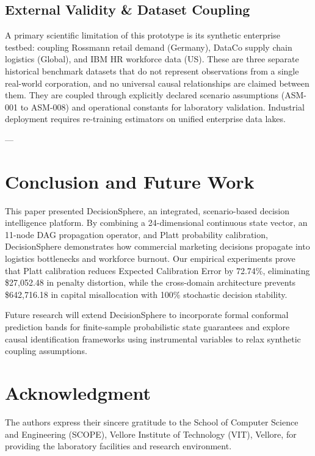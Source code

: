 \documentclass[journal]{IEEEtran}
\begin{document}
\subsection{External Validity & Dataset Coupling}
A primary scientific limitation of this prototype is its synthetic enterprise testbed: coupling Rossmann retail demand (Germany), DataCo supply chain logistics (Global), and IBM HR workforce data (US). These are three separate historical benchmark datasets that do not represent observations from a single real-world corporation, and no universal causal relationships are claimed between them. They are coupled through explicitly declared scenario assumptions (ASM-001 to ASM-008) and operational constants for laboratory validation. Industrial deployment requires re-training estimators on unified enterprise data lakes.

---

\section{Conclusion and Future Work}
This paper presented DecisionSphere, an integrated, scenario-based decision intelligence platform. By combining a 24-dimensional continuous state vector, an 11-node DAG propagation operator, and Platt probability calibration, DecisionSphere demonstrates how commercial marketing decisions propagate into logistics bottlenecks and workforce burnout. Our empirical experiments prove that Platt calibration reduces Expected Calibration Error by 72.74\%, eliminating \$27,052.48 in penalty distortion, while the cross-domain architecture prevents \$642,716.18 in capital misallocation with 100\% stochastic decision stability.

Future research will extend DecisionSphere to incorporate formal conformal prediction bands for finite-sample probabilistic state guarantees and explore causal identification frameworks using instrumental variables to relax synthetic coupling assumptions.

\section*{Acknowledgment}
The authors express their sincere gratitude to the School of Computer Science and Engineering (SCOPE), Vellore Institute of Technology (VIT), Vellore, for providing the laboratory facilities and research environment.



\end{document}
